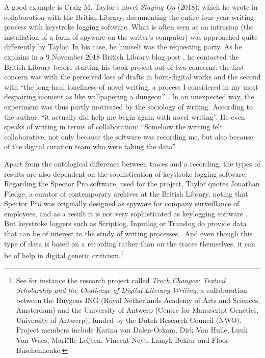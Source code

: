 \begin{paper}
A good example is Craig M. Taylor's novel \emph{Staying On} (2018),
which he wrote in collaboration with the British Library, documenting
the entire four-year writing process with keystroke logging software.
What is often seen as an intrusion (the installation of a form of
spyware on the writer's computer) was approached quite differently by
Taylor. In his case, he himself was the requesting party. As he explains
in a 9 November 2018 British Library blog post \citep{taylor_c_2018},
he contacted the British Library before starting his book project out of
two concerns: the first concern was with the perceived loss of drafts in
born-digital works and the second with ``the long-haul loneliness of
novel writing, a process I considered in my most despairing moment as
like wallpapering a dungeon'' \citep{taylor_c_2018}. In an unexpected way, the
experiment was thus partly motivated by the sociology of writing.
According to the author, ``it actually did help me begin again with
novel writing''. He even speaks of writing in terms of collaboration:
``Somehow the writing felt collaborative, not only because the software
was recording me, but also because of the digital curation team who were
taking the data'' \citep{taylor_c_2018}.

Apart from the ontological difference between traces and a recording,
the types of results are also dependent on the sophistication of
keystroke logging software. Regarding the Spector Pro software, used for
the project, Taylor quotes Jonathan Pledge, a curator of contemporary
archives at the British Library, noting that Spector Pro was originally
designed as spyware for company surveillance of employees, and as a
result it is not very sophisticated as keylogging software \citep[cf.][]{taylor_c_2018}. But keystroke loggers such as Scriptlog, Inputlog or Translog do
provide data that can be of interest to the study of writing processes \citep{bekius_reconstruction_2020,leijten_keystroke_2013,leijten_writing_2014,van_waes_logging_2011}. And even though this type of data is based on a
recording rather than on the traces themselves, it can be of help in
digital genetic criticism.\footnote{See for instance the research
  project called \emph{Track Changes: Textual Scholarship and the
  Challenge of Digital Literary Writing}, a collaboration between the
  Huygens ING (Royal Netherlands Academy of Arts and Sciences,
  Amsterdam) and the University of Antwerp (Centre for Manuscript
  Genetics, University of Antwerp), funded by the Dutch Research Council
  (NWO). Project members include Karina van Dalen-Oskam, Dirk Van Hulle,
  Luuk Van Waes, Mariëlle Leijten, Vincent Neyt, Lamyk Bekius and Floor
  Buschenhenke.}


\end{paper}
